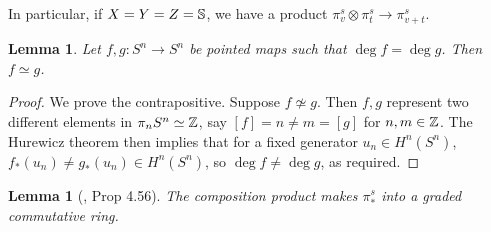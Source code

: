 \documentclass[11pt, titlepage]{article} %
\def\bb{\ensuremath\mathbb}
\def\inte{\ensuremath\mathbb{Z}}
\numberwithin{equation}{subsection}
\theoremstyle{plain}
\newtheorem{lemma}[theorem]{Lemma}
\theoremstyle{definition}
\begin{document}
In particular, if \(X=Y=Z=\bb{S}\), we have a product \(\pi_v^s\otimes \pi_t^s\to \pi_{v+t}^s\).

\begin{lemma}\label{2504281107}
Let \(f, g : S^n \to S^n\) be pointed maps such that \(\deg f = \deg g\). Then \(f \simeq g\). 
\end{lemma}

\begin{proof}
We prove the contrapositive. Suppose \(f \not\simeq g\). Then \(f, g\) represent two different elements in \(\pi_nS^n \simeq \inte\), say \([f]=n\neq m=[g]\) for \(n, m \in \inte\). The Hurewicz theorem then implies that for a fixed generator \(u_n \in H^n(S^n)\), \(f_*(u_n)\neq g_*(u_n)\in H^n(S^n)\), so \(\deg f \neq \deg g\), as required.
\end{proof}

\begin{lemma}[{\autocite{hatcher}, Prop 4.56}]
The composition product makes \(\pi_*^s\) into a graded commutative ring. 
\end{lemma}
\end{document}

